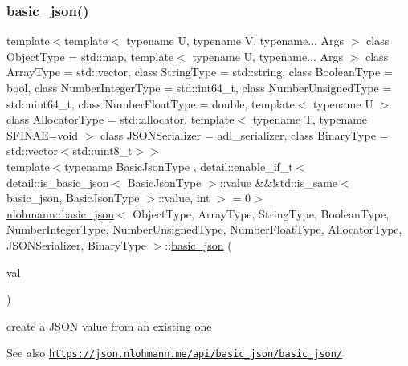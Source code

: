 \subsubsection{\texorpdfstring{basic\+\_\+json()}{basic\_json()}\hspace{0.1cm}{\footnotesize\ttfamily [4/9]}}
{\footnotesize\ttfamily template$<$template$<$ typename U, typename V, typename... Args $>$ class Object\+Type = std\+::map, template$<$ typename U, typename... Args $>$ class Array\+Type = std\+::vector, class String\+Type  = std\+::string, class Boolean\+Type  = bool, class Number\+Integer\+Type  = std\+::int64\+\_\+t, class Number\+Unsigned\+Type  = std\+::uint64\+\_\+t, class Number\+Float\+Type  = double, template$<$ typename U $>$ class Allocator\+Type = std\+::allocator, template$<$ typename T, typename S\+F\+I\+N\+A\+E=void $>$ class J\+S\+O\+N\+Serializer = adl\+\_\+serializer, class Binary\+Type  = std\+::vector$<$std\+::uint8\+\_\+t$>$$>$ \\
template$<$typename Basic\+Json\+Type , detail\+::enable\+\_\+if\+\_\+t$<$ detail\+::is\+\_\+basic\+\_\+json$<$ Basic\+Json\+Type $>$\+::value \&\&!std\+::is\+\_\+same$<$ basic\+\_\+json, Basic\+Json\+Type $>$\+::value, int $>$  = 0$>$ \\
\hyperlink{classnlohmann_1_1basic__json}{nlohmann\+::basic\+\_\+json}$<$ Object\+Type, Array\+Type, String\+Type, Boolean\+Type, Number\+Integer\+Type, Number\+Unsigned\+Type, Number\+Float\+Type, Allocator\+Type, J\+S\+O\+N\+Serializer, Binary\+Type $>$\+::\hyperlink{classnlohmann_1_1basic__json}{basic\+\_\+json} (\begin{DoxyParamCaption}\item[{const Basic\+Json\+Type \&}]{val }\end{DoxyParamCaption})\hspace{0.3cm}{\ttfamily [inline]}}



create a J\+S\+ON value from an existing one 

\begin{DoxySeeAlso}{See also}
\href{https://json.nlohmann.me/api/basic_json/basic_json/}{\tt https\+://json.\+nlohmann.\+me/api/basic\+\_\+json/basic\+\_\+json/} 
\end{DoxySeeAlso}
\mbox{\label{classnlohmann_1_1basic__json_aeac617faf3448d6d2cb33a020be01d37}} 
